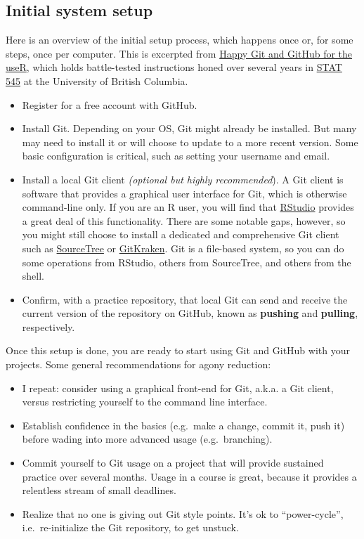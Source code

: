 \documentclass[12pt]{article}
\providecommand{\tightlist}{%
  \setlength{\itemsep}{0pt}\setlength{\parskip}{0pt}}
\begin{document}
\subsection{Initial system setup}\label{initial-system-setup}

Here is an overview of the initial setup process, which happens once or,
for some steps, once per computer. This is excerpted from
\href{http://happygitwithr.com}{Happy Git and GitHub for the useR},
which holds battle-tested instructions honed over several years in
\href{http://stat545.com}{STAT 545} at the University of British
Columbia.

\begin{itemize}
\item
  Register for a free account with GitHub.
\item
  Install Git. Depending on your OS, Git might already be installed. But
  many may need to install it or will choose to update to a more recent
  version. Some basic configuration is critical, such as setting your
  username and email.
\item
  Install a local Git client \emph{(optional but highly recommended}). A
  Git client is software that provides a graphical user interface for
  Git, which is otherwise command-line only. If you are an R user, you
  will find that
  \href{https://www.rstudio.com/products/rstudio-desktop/}{RStudio}
  provides a great deal of this functionality. There are some notable
  gaps, however, so you might still choose to install a dedicated and
  comprehensive Git client such as
  \href{https://www.sourcetreeapp.com}{SourceTree} or
  \href{https://www.gitkraken.com}{GitKraken}. Git is a file-based
  system, so you can do some operations from RStudio, others from
  SourceTree, and others from the shell.
\item
  Confirm, with a practice repository, that local Git can send and
  receive the current version of the repository on GitHub, known as
  \textbf{pushing} and \textbf{pulling}, respectively.
\end{itemize}

Once this setup is done, you are ready to start using Git and GitHub
with your projects. Some general recommendations for agony reduction:

\begin{itemize}
\tightlist
\item
  I repeat: consider using a graphical front-end for Git, a.k.a. a Git
  client, versus restricting yourself to the command line interface.
\item
  Establish confidence in the basics (e.g.~make a change, commit it,
  push it) before wading into more advanced usage (e.g.~branching).
\item
  Commit yourself to Git usage on a project that will provide sustained
  practice over several months. Usage in a course is great, because it
  provides a relentless stream of small deadlines.
\item
  Realize that no one is giving out Git style points. It's ok to
  ``power-cycle'', i.e.~re-initialize the Git repository, to get
  unstuck.
\end{itemize}
\end{document}
